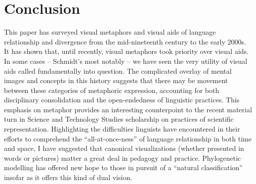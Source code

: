 \documentclass[output=paper]{langscibook}
\begin{document}
\section{Conclusion}
\label{sec:kaplan:conc}

This paper has surveyed visual metaphors and visual aids of language relationship and divergence from the mid-nineteenth century to the early 2000s. It has shown that, until recently, visual metaphors took priority over visual aids. In some cases -- Schmidt's most notably -- we have seen the very utility of visual aids called fundamentally into question. The complicated overlay of mental images and concepts in this history suggests that there may be movement between these categories of metaphoric expression, accounting for both disciplinary consolidation and the open-endedness of linguistic practices. This emphasis on metaphor provides an interesting counterpoint to the recent material turn in Science and Technology Studies scholarship on practices of scientific representation. Highlighting the difficulties linguists have encountered in their efforts to comprehend the ``all-at-once-ness'' of language relationship in both time and space, I have suggested that canonical visualizations (whether presented in words or pictures) matter a great deal in pedagogy and practice. Phylogenetic modelling has offered new hope to those in pursuit of a ``natural classification'' insofar as it offers this kind of dual vision.

\sloppy
\printbibliography[heading=subbibliography,notkeyword=this]
\end{document}

